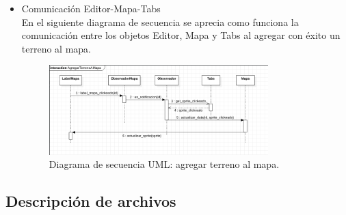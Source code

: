 \documentclass[titlepage,a4paper,12pt]{article}
\begin{document}
\begin{itemize}

\item Comunicación Editor-Mapa-Tabs\\

En el siguiente diagrama de secuencia se aprecia como funciona la comunicación entre los objetos Editor, Mapa y Tabs al agregar con éxito un terreno al mapa.\\

\begin{figure}[H]
	\centering
	\includegraphics[width=0.8\textwidth]{../imagenes/seq_uml_agregar_terreno_editor.png}
	\caption{\label{fig:seq_uml_agregar_terreno} Diagrama de secuencia UML: agregar terreno al mapa.}
\end{figure}

\end{itemize}

\subsection{Descripción de archivos}
\end{document}
